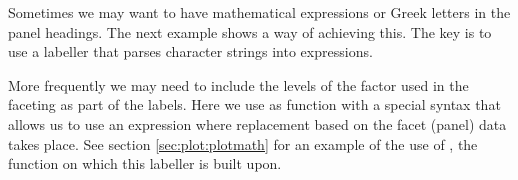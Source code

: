 \documentclass[krantz2]{krantz}\usepackage{knitr}%
\begin{document}
\begin{explainbox}
Sometimes we may want to have mathematical expressions or Greek letters in the panel headings. The next example shows a way of achieving this. The key is to use a labeller that parses character strings into \Rlang expressions.

\begin{knitrout}\footnotesize
{}\color{fgcolor}\begin{kframe}
\begin{alltt}
\hlopt{$} \hlkwb{<-} \hlopt{$}
                        \hlstd{=} \hlstd{(}\hlstd{,} \hlstd{,} \hlstd{))}
 \hlkwb{<-} \hlstd{(}   \hlopt{+}
      \hlstd{()} \hlopt{+}
      \hlstd{(} \hlstd{=}   
\end{alltt}
\end{kframe}
\end{knitrout}

More frequently we may need to include the levels of the factor used in the faceting as part of the labels. Here we use as  function  with a special syntax that allows us to use an expression where replacement based on the facet (panel) data takes place. See section \ref{sec:plot:plotmath} for an example of the use of , the \Rlang function on which this labeller is built upon.



\begin{knitrout}\footnotesize
{}\color{fgcolor}\begin{kframe}
\begin{alltt}
 \hlopt{+}
  \hlstd{(} \hlstd{=} 
              \hlstd{=} \hlstd{(} \hlstd{=} \hlopt{~}\hlstd{))}
\end{alltt}
\end{kframe}
\end{knitrout}

\end{explainbox}
\end{document}
